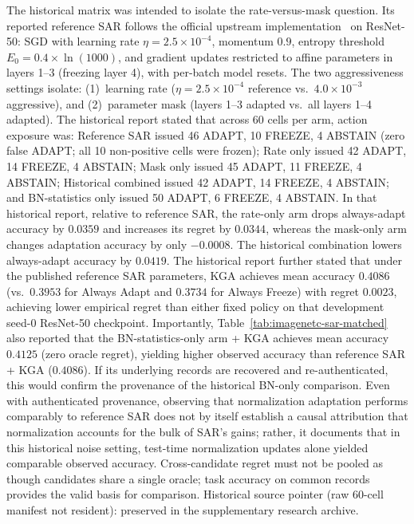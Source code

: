 The historical matrix was intended to isolate the rate-versus-mask question. Its reported reference SAR follows the official upstream implementation~\cite{niu2023sar}
on ResNet-50: SGD with learning rate $\eta = 2.5\times10^{-4}$, momentum $0.9$, entropy threshold $E_0 = 0.4 \times \ln(1000)$,
and gradient updates restricted to affine parameters in layers 1--3 (freezing layer 4), with per-batch model resets.
The two aggressiveness settings isolate: (1)~learning rate ($\eta = 2.5\times 10^{-4}$ reference vs.\ $4.0\times 10^{-3}$ aggressive),
and (2)~parameter mask (layers 1--3 adapted vs.\ all layers 1--4 adapted).
The historical report stated that across 60 cells per arm, action exposure was: Reference SAR issued 46 ADAPT, 10 FREEZE, 4 ABSTAIN (zero false ADAPT; all 10 non-positive cells were frozen);
Rate only issued 42 ADAPT, 14 FREEZE, 4 ABSTAIN; Mask only issued 45 ADAPT, 11 FREEZE, 4 ABSTAIN; Historical combined issued 42 ADAPT, 14 FREEZE, 4 ABSTAIN;
and BN-statistics only issued 50 ADAPT, 6 FREEZE, 4 ABSTAIN.
In that historical report, relative to reference SAR, the rate-only arm drops always-adapt accuracy by $0.0359$ and increases its regret by
$0.0344$, whereas the mask-only arm changes adaptation accuracy by only $-0.0008$. The historical combination
lowers always-adapt accuracy by $0.0419$. The historical report further stated that under the published reference SAR parameters,
KGA achieves mean accuracy $0.4086$ (vs.\ $0.3953$ for Always Adapt and $0.3734$ for Always Freeze) with
regret $0.0023$, achieving lower empirical regret than either fixed policy on that development seed-0 ResNet-50 checkpoint.
Importantly, Table~\ref{tab:imagenetc-sar-matched} also reported that the BN-statistics-only arm + KGA achieves
mean accuracy $0.4125$ (zero oracle regret), yielding higher observed accuracy than reference SAR + KGA ($0.4086$).
If its underlying records are recovered and re-authenticated, this would confirm the provenance of the historical BN-only comparison. Even with authenticated provenance, observing that normalization adaptation performs comparably to reference SAR does not by itself establish a causal attribution that normalization accounts for the bulk of SAR's gains; rather, it documents that in this historical noise setting, test-time normalization updates alone yielded comparable observed accuracy. Cross-candidate regret must not be pooled as though candidates
share a single oracle; task accuracy on common records provides the valid basis for comparison.
Historical source pointer (raw 60-cell manifest not resident): preserved in the supplementary research archive.

